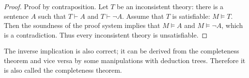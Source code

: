 \begin{proof}
Proof by contraposition.
Let $T$ be an inconsistent theory: there is a sentence $A$ such that $T \vdash A$ and $T \vdash \neg A$.
Assume that $T$ is satisfiable: $M \vDash T$.
Then the soundness of the proof system implies that $M \vDash A$ and $M \vDash \neg A$, which is a contradiction.
Thus every inconsistent theory is unsatisfiable.
\end{proof}

The inverse implication is also correct; it can be derived from the completeness theorem and vice versa by some manipulations with deduction trees.
Therefore it is also called the completeness theorem.
